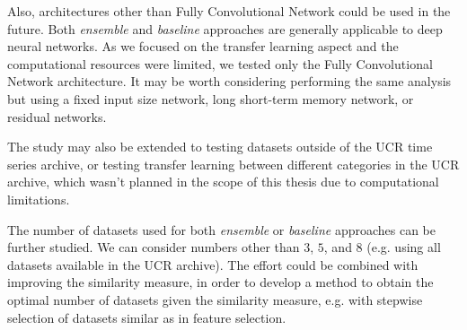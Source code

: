 \documentclass[a4paper,11pt,twoside]{report}
\theoremstyle{definition}
\begin{document}
Also, architectures other than Fully Convolutional Network could be used in the future. Both\textit{ ensemble }and\textit{ baseline} approaches are generally applicable to deep neural networks. As we focused on the transfer learning aspect and the computational resources were limited, we tested only the Fully Convolutional Network architecture. It may be worth considering performing the same analysis but using a fixed input size network, long short-term memory network, or residual networks.

The study may also be extended to testing datasets outside of the UCR time series archive,  or testing transfer learning between different categories in the UCR archive, which wasn't planned in the scope of this thesis due to computational limitations.

The number of datasets used for both \textit{ensemble} or \textit{baseline} approaches can be further studied. We can consider numbers other than $3$, $5$, and $8$ (e.g. using all datasets available in the UCR archive). The effort could be combined with improving the similarity measure, in order to develop a method to obtain the optimal number of datasets given the similarity measure, e.g. with stepwise selection of datasets similar as in feature selection.




\


\thispagestyle{empty}
\end{document}
